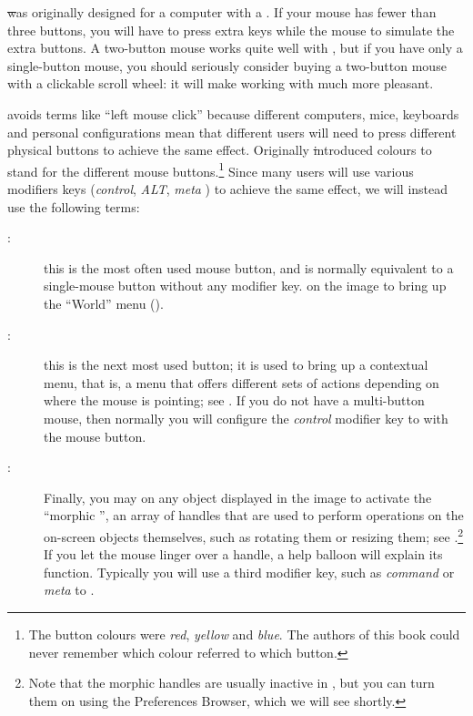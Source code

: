 \documentclass[a4paper,10pt,twoside]{book}
\begin{document}

\st was originally designed for a computer with a .  If your mouse has fewer than three buttons, you will have to press extra keys while  the mouse to simulate the extra buttons.  A two-button mouse works quite well with \pharo, but if you have only a single-button mouse, you should seriously consider buying a two-button mouse with a clickable scroll wheel: it will make working with \pharo much more pleasant.

\pharo avoids terms like ``left mouse click'' because different computers, mice, keyboards and personal configurations mean that different users will need to press different physical buttons to achieve the same effect.
Originally \st introduced colours to stand for the different mouse buttons.\footnote{The button colours were \emph{red}, \emph{yellow} and \emph{blue}. The authors of this book could never remember which colour referred to which button.}
Since many users will use various modifiers keys (\emph{control}, \emph{ALT}, \emph{meta} \etc) to achieve the same effect, we will instead use the following terms:
\begin{description}
\item [\click:] this is the most often used mouse button, and is normally equivalent to  a single-mouse button without any modifier key. \click on the image to bring up the ``World'' menu ().
\item [\actclick:] this is the next most used button; it is used to bring up a contextual menu, that is, a menu that offers different sets of actions depending on where the mouse is pointing; see . If you do not have a multi-button mouse, then normally you will configure the \emph{control} modifier key to \actclick with the mouse button.
\item [\metaclick:] Finally, you may \metaclick on any object displayed in the image to activate the ``morphic '', an array of handles that are used to perform operations on the on-screen objects themselves, such as rotating them or resizing them; see .\footnote{Note that the morphic handles are usually inactive in \pharo, but you can turn them on using the Preferences Browser, which we will see shortly.}
If you let the mouse linger over a handle, a help balloon will explain its function.
Typically you will use a third modifier key, such as \emph{command} or \emph{meta} to \metaclick.
\end{description}
\end{document}

